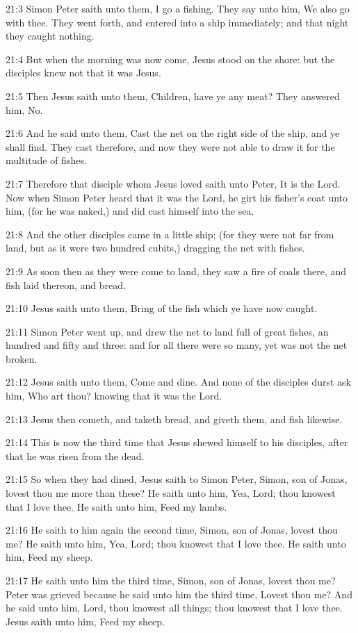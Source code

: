 21:3 Simon Peter saith unto them, I go a fishing. They say unto him, We also go with thee. They went forth, and entered into a ship immediately; and that night they caught nothing.

21:4 But when the morning was now come, Jesus stood on the shore: but the disciples knew not that it was Jesus.

21:5 Then Jesus saith unto them, Children, have ye any meat? They answered him, No.

21:6 And he said unto them, Cast the net on the right side of the ship, and ye shall find. They cast therefore, and now they were not able to draw it for the multitude of fishes.

21:7 Therefore that disciple whom Jesus loved saith unto Peter, It is the Lord. Now when Simon Peter heard that it was the Lord, he girt his fisher's coat unto him, (for he was naked,) and did cast himself into the sea.

21:8 And the other disciples came in a little ship; (for they were not far from land, but as it were two hundred cubits,) dragging the net with fishes.

21:9 As soon then as they were come to land, they saw a fire of coals there, and fish laid thereon, and bread.

21:10 Jesus saith unto them, Bring of the fish which ye have now caught.

21:11 Simon Peter went up, and drew the net to land full of great fishes, an hundred and fifty and three: and for all there were so many, yet was not the net broken.

21:12 Jesus saith unto them, Come and dine. And none of the disciples durst ask him, Who art thou? knowing that it was the Lord.

21:13 Jesus then cometh, and taketh bread, and giveth them, and fish likewise.

21:14 This is now the third time that Jesus shewed himself to his disciples, after that he was risen from the dead.

21:15 So when they had dined, Jesus saith to Simon Peter, Simon, son of Jonas, lovest thou me more than these? He saith unto him, Yea, Lord; thou knowest that I love thee. He saith unto him, Feed my lambs.

21:16 He saith to him again the second time, Simon, son of Jonas, lovest thou me? He saith unto him, Yea, Lord; thou knowest that I love thee. He saith unto him, Feed my sheep.

21:17 He saith unto him the third time, Simon, son of Jonas, lovest thou me? Peter was grieved because he said unto him the third time, Lovest thou me? And he said unto him, Lord, thou knowest all things; thou knowest that I love thee. Jesus saith unto him, Feed my sheep.


